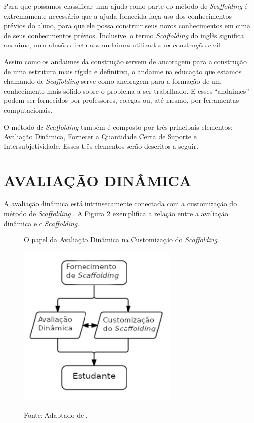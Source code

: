 Para que possamos classificar uma ajuda como parte do método de \textit{Scaffolding} é extremamente necessário que a ajuda fornecida faça uso dos conhecimentos prévios do aluno, para que ele possa construir seus novos conhecimentos em cima de seus conhecimentos prévios. Inclusive, o termo \textit{Scaffolding} do inglês significa andaime, uma alusão direta aos andaimes utilizados na construção civil. 

Assim como os andaimes da construção servem de ancoragem para a construção de uma estrutura mais rígida e definitiva, o andaime na educação que estamos chamando de \textit{Scaffolding} serve como ancoragem para a formação de um conhecimento mais sólido sobre o problema a ser trabalhado. E esses “andaimes” podem ser fornecidos por professores, colegas ou, até mesmo, por ferramentas computacionais. 

O método de \textit{Scaffolding} também é composto por três principais elementos: Avaliação Dinâmica, Fornecer a Quantidade Certa de Suporte e Intersubjetividade. Esses três elementos serão descritos a seguir. 

\section{AVALIAÇÃO DINÂMICA}

A avaliação dinâmica está intrinsecamente conectada com a customização do método de \textit{Scaffolding} \cite{Belland2017,wood1976}. A Figura 2 exemplifica a relação entre a avaliação dinâmica e o \textit{Scaffolding}.

\begin{figure}[htp]
\begin{center}
\caption{O papel da Avaliação Dinâmica na Customização do \textit{Scaffolding}.}
\includegraphics[width=0.7\textwidth]{fig/avaliacaodinamica.png}
\label{fig:avadinamica}
\caption*{Fonte: Adaptado de .}
\end{center}
\end{figure}

